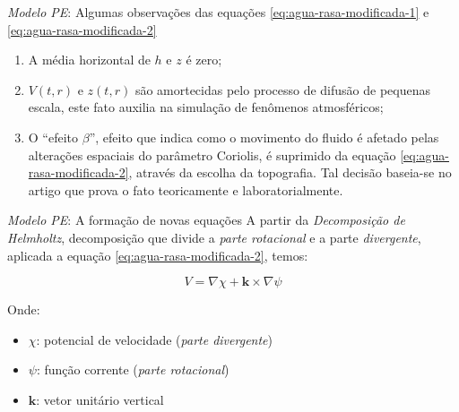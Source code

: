 \begin{frame}{\textit{Modelo PE}: Algumas observações das equações \eqref{eq:agua-rasa-modificada-1} e \eqref{eq:agua-rasa-modificada-2}}
	\begin{enumerate}
		\item A média horizontal de $h$ e $z$ é zero;
		\item $V(t,r)$ e $z(t,r)$ são amortecidas pelo processo de difusão de pequenas escala, este fato auxilia na simulação de fenômenos atmosféricos;
		\item O ``efeito $\beta$'', efeito que indica como o movimento do fluido é afetado pelas alterações espaciais do parâmetro Coriolis, é suprimido da equação \eqref{eq:agua-rasa-modificada-2}, através da escolha da topografia. Tal decisão baseia-se no artigo \cite{von_arx1952} que prova o fato teoricamente e laboratorialmente. 
	\end{enumerate}
\end{frame}



\begin{frame}{\textit{Modelo PE}: A formação de novas equações}
	A partir da \textit{Decomposição de Helmholtz}, decomposição que divide a \textit{parte rotacional} e a parte \textit{divergente}, aplicada a equação \eqref{eq:agua-rasa-modificada-2}, temos:
	
	\begin{equation}
		V = \nabla\chi + \mathbf{k} \times \nabla \psi \label{eq:decomposicao-helmholtz}
	\end{equation}
	
	Onde:
	\begin{itemize}
		\item $\chi$: potencial de velocidade (\textit{parte divergente})
		\item $\psi$: função corrente (\textit{parte rotacional})
		\item $\mathbf{k}$: vetor unitário vertical
	\end{itemize}
\end{frame}


